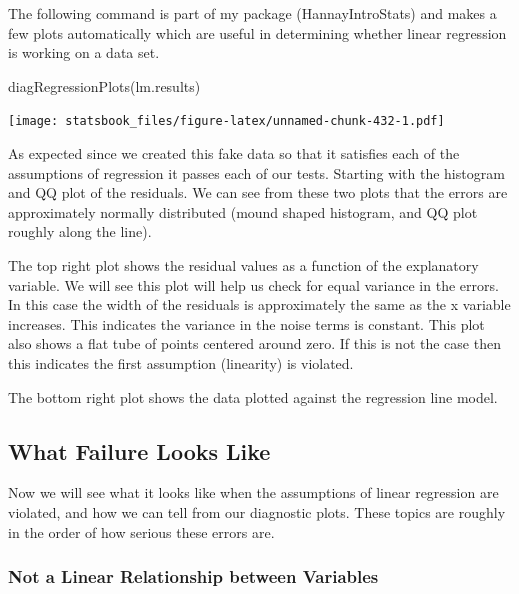 \documentclass[
]{book}
\newenvironment{Shaded}{\begin{snugshade}}{\end{snugshade}}
\newcommand{\FunctionTok}[1]{\textcolor[rgb]{0.00,0.00,0.00}{#1}}
\newcommand{\NormalTok}[1]{#1}
\theoremstyle{definition}
\theoremstyle{definition}
\theoremstyle{definition}
\theoremstyle{definition}
\theoremstyle{remark}
\begin{document}
The following command is part of my package (HannayIntroStats) and makes a few plots automatically which are useful in determining whether linear regression is working on a data set.

\begin{Shaded}
\begin{Highlighting}[]
\FunctionTok{diagRegressionPlots}\NormalTok{(lm.results)}
\end{Highlighting}
\end{Shaded}

\texttt{[image: statsbook\_files/figure-latex/unnamed-chunk-432-1.pdf]}

As expected since we created this fake data so that it satisfies each of the assumptions of regression it passes each of our tests. Starting with the histogram and QQ plot of the residuals. We can see from these two plots that the errors are approximately normally distributed (mound shaped histogram, and QQ plot roughly along the line).

The top right plot shows the residual values as a function of the explanatory variable. We will see this plot will help us check for equal variance in the errors. In this case the width of the residuals is approximately the same as the x variable increases. This indicates the variance in the noise terms is constant. This plot also shows a flat tube of points centered around zero. If this is not the case then this indicates the first assumption (linearity) is violated.

The bottom right plot shows the data plotted against the regression line model.

\hypertarget{what-failure-looks-like}{%
\subsection{What Failure Looks Like}\label{what-failure-looks-like}}

Now we will see what it looks like when the assumptions of linear regression are violated, and how we can tell from our diagnostic plots. These topics are roughly in the order of how serious these errors are.

\hypertarget{not-a-linear-relationship-between-variables}{%
\subsubsection{Not a Linear Relationship between Variables}\label{not-a-linear-relationship-between-variables}}
\end{document}
